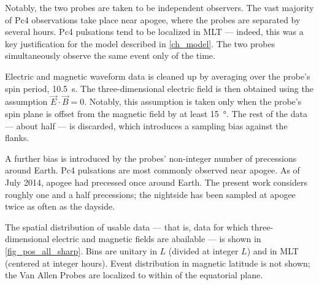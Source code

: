 Notably, the two probes are taken to be independent observers. The vast majority of Pc4 observations take place near apogee, where the probes are separated by several hours. Pc4 pulsations tend to be localized in MLT --- indeed, this was a key justification for the model described in \cref{ch_model}. The two probes simultaneously observe the same event only \todo{$\cdots$} of the time. 


Electric and magnetic waveform data is cleaned up by averaging over the probe's spin period, \SI{10.5}{\s}. The three-dimensional electric field is then obtained using the assumption $\vec{E} \cdot \vec{B} = 0$. Notably, this assumption is taken only when the probe's spin plane is offset from the magnetic field by at least \SI{15}{\degree}. The rest of the data --- about half --- is discarded, which introduces a sampling bias against the flanks. 

A further bias is introduced by the probes' non-integer number of precessions around Earth. Pc4 pulsations are most commonly observed near apogee. As of July 2014, apogee had precessed once around Earth\cite{dai_2015}. The present work considers roughly one and a half precessions; the nightside has been sampled at apogee twice as often as the dayside. 

The spatial distribution of usable data --- that is, data for which three-dimensional electric and magnetic fields are abailable --- is shown in \cref{fig_pos_all_sharp}. Bins are unitary in $L$ (divided at integer $L$) and in MLT (centered at integer hours). Event distribution in magnetic latitude is not shown; the Van Allen Probes are localized to within  of the equatorial plane. 


